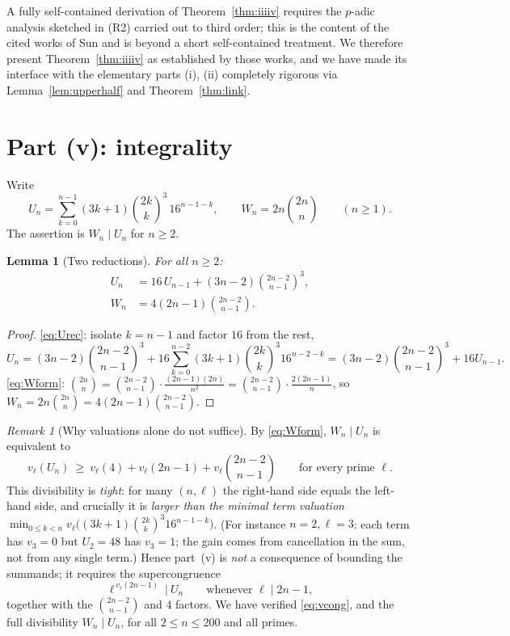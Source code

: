 \documentclass[12pt]{article}
\newtheorem{lemma}{Lemma}
\theoremstyle{remark}
\newtheorem{remark}{Remark}
\newcommand{\bin}[2]{\binom{#1}{#2}}
\begin{document}
A fully self-contained derivation of Theorem~\ref{thm:iiiiv} requires the
$p$-adic analysis sketched in (R2) carried out to third order; this is the
content of the cited works of Sun and is beyond a short self-contained
treatment.  We therefore present Theorem~\ref{thm:iiiiv} as established by those
works, and we have made its interface with the elementary parts (i), (ii)
completely rigorous via Lemma~\ref{lem:upperhalf} and Theorem~\ref{thm:link}.

\section{Part (v): integrality}

Write
\[
U_n=\sum_{k=0}^{n-1}(3k+1)\bin{2k}{k}^3\,16^{n-1-k},\qquad
W_n=2n\bin{2n}{n}\qquad(n\ge1).
\]
The assertion is $W_n\mid U_n$ for $n\ge2$.

\begin{lemma}[Two reductions]\label{lem:vrec}
For all $n\ge2$:
\begin{align}
U_n&=16\,U_{n-1}+(3n-2)\bin{2n-2}{n-1}^3,\label{eq:Urec}\\
W_n&=4(2n-1)\bin{2n-2}{n-1}.\label{eq:Wform}
\end{align}
\end{lemma}

\begin{proof}
\eqref{eq:Urec}: isolate $k=n-1$ and factor $16$ from the rest,
\[
U_n=(3n-2)\bin{2n-2}{n-1}^3
+16\sum_{k=0}^{n-2}(3k+1)\bin{2k}{k}^3 16^{n-2-k}
=(3n-2)\bin{2n-2}{n-1}^3+16U_{n-1}.
\]
\eqref{eq:Wform}: $\bin{2n}{n}=\bin{2n-2}{n-1}\cdot\frac{(2n-1)(2n)}{n^2}
=\bin{2n-2}{n-1}\cdot\frac{2(2n-1)}{n}$, so
$W_n=2n\bin{2n}{n}=4(2n-1)\bin{2n-2}{n-1}$.
\end{proof}

\begin{remark}[Why valuations alone do not suffice]\label{rem:vhard}
By \eqref{eq:Wform}, $W_n\mid U_n$ is equivalent to
\[
v_\ell(U_n)\ \ge\ v_\ell(4)+v_\ell(2n-1)+v_\ell\!\bin{2n-2}{n-1}
\qquad\text{for every prime }\ell .
\]
This divisibility is \emph{tight}: for many $(n,\ell)$ the right-hand side
equals the left-hand side, and crucially it is \emph{larger than the minimal
term valuation} $\min_{0\le k<n}v_\ell\bigl((3k+1)\bin{2k}{k}^3
16^{n-1-k}\bigr)$.  (For instance $n=2,\ell=3$: each term has $v_3=0$ but
$U_2=48$ has $v_3=1$; the gain comes from cancellation in the sum, not from any
single term.)  Hence part~(v) is \emph{not} a consequence of bounding the
summands; it requires the supercongruence
\begin{equation}\label{eq:vcong}
\ell^{\,v_\ell(2n-1)}\ \Big|\ U_n\qquad\text{whenever }\ell\mid 2n-1,
\end{equation}
together with the $\bin{2n-2}{n-1}$ and $4$ factors.  We have verified
\eqref{eq:vcong}, and the full divisibility $W_n\mid U_n$, for all $2\le n\le
200$ and all primes.
\end{remark}
\end{document}
